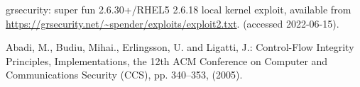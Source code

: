 \documentclass[paper]{ieice}
\begin{document}
\begin{thebibliography}{99}
  grsecurity: super fun 2.6.30+/RHEL5 2.6.18 local kernel exploit, available from \url{https://grsecurity.net/~spender/exploits/exploit2.txt}. (accessed 2022-06-15).


  Abadi, M., Budiu, Mihai., Erlingsson, U. and Ligatti, J.: Control-Flow Integrity Principles, Implementations, the 12th ACM Conference on Computer and Communications Security (CCS), pp. 340--353, (2005).
 


\end{thebibliography}
\end{document}
